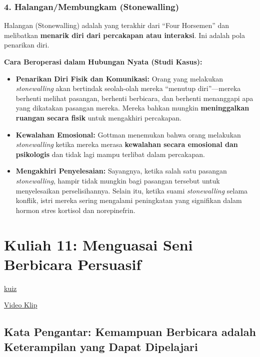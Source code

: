 \documentclass[
  letterpaper,
  DIV=11,
  numbers=noendperiod]{scrreprt}
\providecommand{\tightlist}{%
  \setlength{\itemsep}{0pt}\setlength{\parskip}{0pt}}
\begin{document}
\subsection{4. Halangan/Membungkam
(Stonewalling)}\label{halanganmembungkam-stonewalling}

Halangan (Stonewalling) adalah yang terakhir dari ``Four Horsemen'' dan
melibatkan \textbf{menarik diri dari percakapan atau interaksi}. Ini
adalah pola penarikan diri.

\textbf{Cara Beroperasi dalam Hubungan Nyata (Studi Kasus):}

\begin{itemize}
\tightlist
\item
  \textbf{Penarikan Diri Fisik dan Komunikasi:} Orang yang melakukan
  \emph{stonewalling} akan bertindak seolah-olah mereka ``menutup
  diri''---mereka berhenti melihat pasangan, berhenti berbicara, dan
  berhenti menanggapi apa yang dikatakan pasangan mereka. Mereka bahkan
  mungkin \textbf{meninggalkan ruangan secara fisik} untuk mengakhiri
  percakapan.
\item
  \textbf{Kewalahan Emosional:} Gottman menemukan bahwa orang melakukan
  \emph{stonewalling} ketika mereka merasa \textbf{kewalahan secara
  emosional dan psikologis} dan tidak lagi mampu terlibat dalam
  percakapan.
\item
  \textbf{Mengakhiri Penyelesaian:} Sayangnya, ketika salah satu
  pasangan \emph{stonewalling}, hampir tidak mungkin bagi pasangan
  tersebut untuk menyelesaikan perselisihannya. Selain itu, ketika suami
  \emph{stonewalling} selama konflik, istri mereka sering mengalami
  peningkatan yang signifikan dalam hormon stres kortisol dan
  norepinefrin.
\end{itemize}


\chapter{Kuliah 11: Menguasai Seni Berbicara
Persuasif}\label{kuliah-11-menguasai-seni-berbicara-persuasif}

\href{https://forms.office.com/r/j6v9j2VJer}{kuiz}

\href{https://youtu.be/y6O2YRh-RK8}{Video Klip}

\section{\texorpdfstring{\textbf{Kata Pengantar: Kemampuan Berbicara
adalah Keterampilan yang Dapat
Dipelajari}}{Kata Pengantar: Kemampuan Berbicara adalah Keterampilan yang Dapat Dipelajari}}\label{kata-pengantar-kemampuan-berbicara-adalah-keterampilan-yang-dapat-dipelajari}
\end{document}
